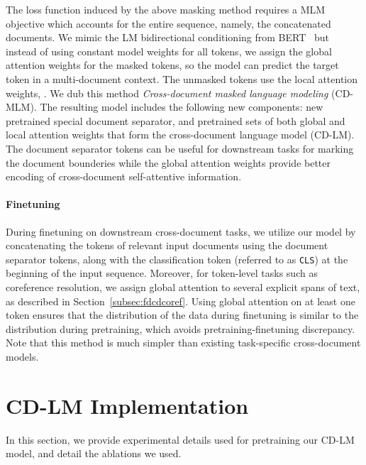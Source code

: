 \documentclass[11pt,a4paper]{article}
\begin{document}
The loss function induced by the above masking method requires a MLM objective which accounts for the entire sequence, namely, the concatenated documents. We mimic the LM bidirectional conditioning from BERT~\cite{devlin-etal-2019-bert} but instead of using constant model weights for all tokens, we assign the global attention weights  for the masked tokens, so the model can predict the target token in a multi-document context. The unmasked tokens use the local attention weights, . We dub this method \emph{Cross-document masked language modeling} (CD-MLM). The resulting model includes the following new components: new pretrained special document separator, and pretrained sets of both global and local attention weights that form the cross-document language model (CD-LM). The document separator tokens can be useful for downstream tasks for marking the document bounderies while the global attention weights provide better encoding of cross-document self-attentive information.

\paragraph{Finetuning} During finetuning on downstream cross-document tasks, we utilize our model by concatenating the tokens of relevant input documents using the document separator tokens, along with the classification token (referred to as {\tt CLS}) at the beginning of the input sequence. Moreover, for token-level tasks such as coreference resolution, we assign global attention to several explicit spans of text, as described in Section~\ref{subsec:fdcdcoref}. Using global attention on at least one token ensures that the distribution of the data during finetuning is similar to the distribution during pretraining, which avoids pretraining-finetuning discrepancy.
Note that this method is much simpler than existing task-specific cross-document models. \section{CD-LM Implementation}
\label{sec:res}

In this section, we provide experimental details used for pretraining our CD-LM model, and detail the ablations we used. 
\end{document}
